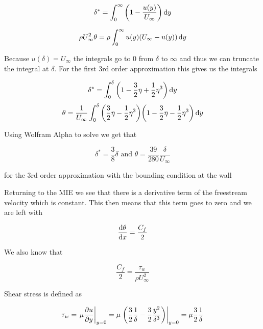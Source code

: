 \documentclass{report}
\begin{document}
\begin{equation}
   \delta^* = \int_{0}^{\infty}\qty(1-\frac{u(y)}{U_{\infty}})\dd{y}
\end{equation}

\begin{equation}
   \rho U^2_{\infty} \theta = \rho \int_{0}^{\infty} u(y)\qty(U_{\infty}-u(y)) \dd{y}
\end{equation}

Because $u(\delta) = U_{\infty}$ the integrals go to 0 from $\delta \text{ to } \infty$ and thus we can truncate the integral at $\delta$.
For the first 3rd order approximation this gives us the integrals

\begin{equation}
   \delta^* = \int_{0}^{\delta}\qty(1-\frac{3}{2}\eta+\frac{1}{2}\eta^3)\dd{y}
\end{equation}
\begin{equation}
   \theta = \frac{1}{U_{\infty}}\int_{0}^{\delta}\qty(\frac{3}{2}\eta-\frac{1}{2}\eta^3)\qty(1-\frac{3}{2}\eta-\frac{1}{2}\eta^3)\dd{y}
\end{equation}

Using Wolfram Alpha to solve we get that

\begin{equation}
   \delta^* = \frac{3}{8}\delta \text{ and } \theta = \frac{39}{280}\frac{\delta}{U_{\infty}}
\end{equation}

for the 3rd order approximation with the bounding condition at the wall

Returning to the MIE we see that there is a derivative term of the freestream velocity which is constant.
This then means that this term goes to zero and we are left with

\begin{equation}
   \dv{\theta}{x} = \frac{C_f}{2}
\end{equation}

We also know that

\begin{equation}
   \frac{C_f}{2} = \frac{\tau_w}{\rho U^2_{\infty}}
\end{equation}

Shear stress is defined as

\begin{equation}
   \tau_w = \eval{\mu\pdv{u}{y}}_{y=0} = \mu \eval{\qty(\frac{3}{2}\frac{1}{\delta}-\frac{3}{2}\frac{y^2}{\delta^3})}_{y=0} = \mu \frac{3}{2} \frac{1}{\delta}
\end{equation}
\end{document}
